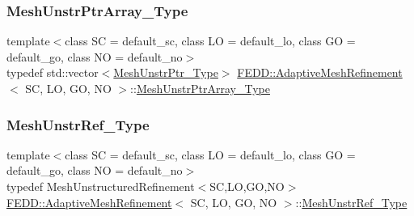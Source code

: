 \subsubsection{\texorpdfstring{Mesh\+Unstr\+Ptr\+Array\+\_\+\+Type}{MeshUnstrPtrArray\_Type}}
{\footnotesize\ttfamily template$<$class SC = default\+\_\+sc, class LO = default\+\_\+lo, class GO = default\+\_\+go, class NO = default\+\_\+no$>$ \\
typedef std\+::vector$<$\hyperlink{classFEDD_1_1AdaptiveMeshRefinement_abc927c0c0253b094c3c53338f9128d20}{Mesh\+Unstr\+Ptr\+\_\+\+Type}$>$ \hyperlink{classFEDD_1_1AdaptiveMeshRefinement}{F\+E\+D\+D\+::\+Adaptive\+Mesh\+Refinement}$<$ SC, LO, GO, NO $>$\+::\hyperlink{classFEDD_1_1AdaptiveMeshRefinement_aae5b66cd506467dbeff01795c41cafcb}{Mesh\+Unstr\+Ptr\+Array\+\_\+\+Type}}

\mbox{\label{classFEDD_1_1AdaptiveMeshRefinement_ade0625d6a1aa9c3586f3b04abb0a9e5e}} 
\subsubsection{\texorpdfstring{Mesh\+Unstr\+Ref\+\_\+\+Type}{MeshUnstrRef\_Type}}
{\footnotesize\ttfamily template$<$class SC = default\+\_\+sc, class LO = default\+\_\+lo, class GO = default\+\_\+go, class NO = default\+\_\+no$>$ \\
typedef Mesh\+Unstructured\+Refinement$<$SC,LO,GO,NO$>$ \hyperlink{classFEDD_1_1AdaptiveMeshRefinement}{F\+E\+D\+D\+::\+Adaptive\+Mesh\+Refinement}$<$ SC, LO, GO, NO $>$\+::\hyperlink{classFEDD_1_1AdaptiveMeshRefinement_ade0625d6a1aa9c3586f3b04abb0a9e5e}{Mesh\+Unstr\+Ref\+\_\+\+Type}}

\mbox{\label{classFEDD_1_1AdaptiveMeshRefinement_ad166d4fc2a5e64ed6c4b5ee3941c77bf}} 
